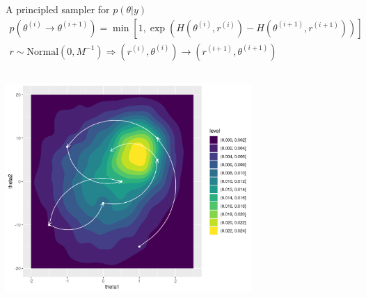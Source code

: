 \documentclass[bigger]{beamer}
\begin{document}
\begin{frame}[label={sec:org998ce0a}]{A principled sampler for \(p(\theta|y)\)}
\begin{align*}
  p(\theta^{(i)} \rightarrow \theta^{(i+1)}) =\min\left[
    1, \exp{(H(\theta^{(i)}, r^{(i)}) - H(\theta^{(i+1)}, r^{(i+1)}))}
  \right]\\
  r \sim \text{Normal}(0, M^{-1}) \Longrightarrow
  (r^{(i)}, \theta^{(i)}) \rightarrow (r^{(i+1)}, \theta^{(i+1)})
\end{align*}
\begin{columns}
\begin{column}{0.7\columnwidth}
\begin{center}
\includegraphics[width=0.7\textwidth]{./figure/sampler_path.png}
\end{center}
\end{column}


\end{columns}
\end{frame}
\end{document}
